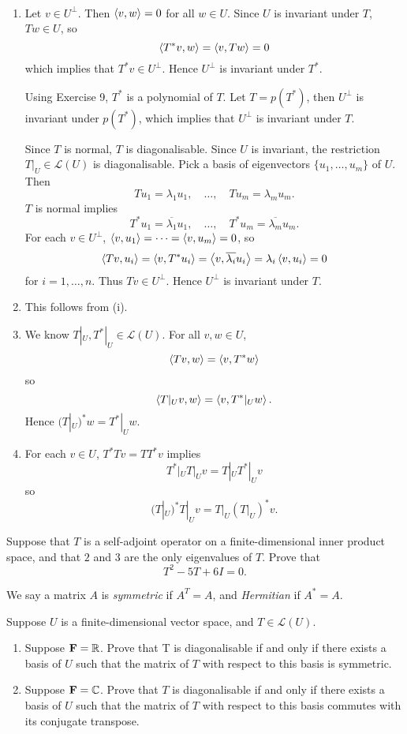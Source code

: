 \begin{solution} \
\begin{enumerate}[label=(\roman*)]
\item Let $v\in U^\perp$. Then $\left\langle v,w\right\rangle=0$ for all $w\in U$.
Since $U$ is invariant under $T$, $Tw\in U$, so
\[\left\langle T^*v,w\right\rangle=\left\langle v,Tw\right\rangle=0\]
which implies that $T^*v\in U^\perp$. Hence $U^\perp$ is invariant under $T^*$.

Using Exercise 9, $T^*$ is a polynomial of $T$. Let $T=p(T^*)$, then $U^\perp$ is invariant under $p(T^*)$, which implies that $U^\perp$ is invariant under $T$.

Since $T$ is normal, $T$ is diagonalisable. Since $U$ is invariant, the restriction $T|_U\in\mathcal{L}(U)$ is diagonalisable. 
Pick a basis of eigenvectors $\{u_1,\dots,u_m\}$ of $U$. Then
\[Tu_1=\lambda_1 u_1,\quad\dots,\quad Tu_m=\lambda_m u_m.\]
$T$ is normal implies
\[T^*u_1=\overline{\lambda_1}u_1,\quad\dots,\quad T^*u_m=\overline{\lambda_m}u_m.\]
For each $v\in U^\perp$, $\left\langle v,u_1\right\rangle=\cdots=\left\langle v,u_m\right\rangle=0$, so
\[\left\langle Tv,u_i\right\rangle=\left\langle v,T^*u_i\right\rangle=\left\langle v,\overline{\lambda_i}u_i\right\rangle=\lambda_i\left\langle v,u_i\right\rangle=0\]
for $i=1,\dots,n$. 
Thus $Tv\in U^\perp$. Hence $U^\perp$ is invariant under $T$.

\item This follows from (i).

\item We know $T|_U,T^*|_U\in\mathcal{L}(U)$. For all $v,w\in U$,
\[\left\langle Tv,w\right\rangle=\left\langle v,T^*w\right\rangle\]
so
\[\left\langle T|_U v,w\right\rangle=\left\langle v,T^*|_U w\right\rangle.\]
Hence $(T|_U)^*w=T^*|_U w$.

\item For each $v\in U$, $T^*Tv=TT^*v$ implies
\[T^*|_U T|_U v=T|_U T^*|_U v\]
so
\[(T|_U)^* T|_U v=T|_U (T|_U)^*v.\]
\end{enumerate}
\end{solution}

\begin{exercise}
Suppose that $T$ is a self-adjoint operator on a finite-dimensional inner product space, and that $2$ and $3$ are the only eigenvalues of $T$. Prove that
\[T^2-5T+6I=0.\]
\end{exercise}

We say a matrix $A$ is \emph{symmetric} if $A^T=A$, and \emph{Hermitian} if $A^*=A$.

\begin{exercise}
Suppose $U$ is a finite-dimensional vector space, and $T\in\mathcal{L}(U)$.
\begin{enumerate}[label=(\roman*)]
\item Suppose $\mathbf F=\mathbb R$. Prove that T is diagonalisable if and only if there exists a basis of $U$ such that the matrix of $T$ with respect to this basis is symmetric.
\item Suppose $\mathbf F=\mathbb C$. Prove that $T$ is diagonalisable if and only if there exists a basis of $U$ such that the matrix of $T$ with respect to this basis commutes with its conjugate transpose.
\end{enumerate}
\end{exercise}

